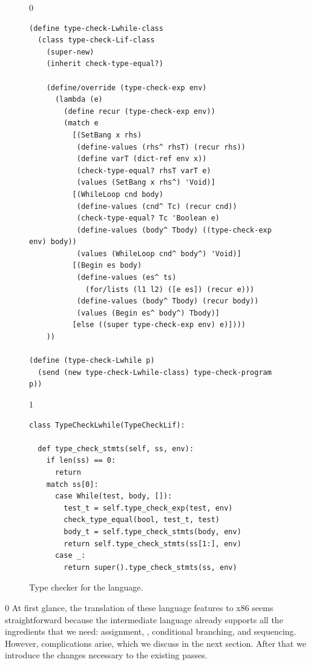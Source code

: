 \documentclass[7x10]{TimesAPriori_MIT}%
\def\racketEd{0}
\def\pythonEd{1}
\def\edition{1}
\newcommand{\pythonColor}[0]{}
\numberwithin{theorem}{chapter}
\numberwithin{definition}{chapter}
\numberwithin{equation}{chapter}
\begin{document}
\begin{figure}[tbp]
\begin{tcolorbox}[colback=white]  
{\if\edition\racketEd    
\begin{lstlisting}[basicstyle=\ttfamily\footnotesize]
(define type-check-Lwhile-class
  (class type-check-Lif-class
    (super-new)
    (inherit check-type-equal?)

    (define/override (type-check-exp env)
      (lambda (e)
        (define recur (type-check-exp env))
        (match e
          [(SetBang x rhs)
           (define-values (rhs^ rhsT) (recur rhs))
           (define varT (dict-ref env x))
           (check-type-equal? rhsT varT e)
           (values (SetBang x rhs^) 'Void)]
          [(WhileLoop cnd body)
           (define-values (cnd^ Tc) (recur cnd))
           (check-type-equal? Tc 'Boolean e)
           (define-values (body^ Tbody) ((type-check-exp env) body))
           (values (WhileLoop cnd^ body^) 'Void)]
          [(Begin es body)
           (define-values (es^ ts)
             (for/lists (l1 l2) ([e es]) (recur e)))
           (define-values (body^ Tbody) (recur body))
           (values (Begin es^ body^) Tbody)]
          [else ((super type-check-exp env) e)])))
    ))

(define (type-check-Lwhile p)
  (send (new type-check-Lwhile-class) type-check-program p))
\end{lstlisting}
\fi}
{\if\edition\pythonEd\pythonColor
\begin{lstlisting}
class TypeCheckLwhile(TypeCheckLif):

  def type_check_stmts(self, ss, env):
    if len(ss) == 0:
      return
    match ss[0]:
      case While(test, body, []):
        test_t = self.type_check_exp(test, env)
        check_type_equal(bool, test_t, test)
        body_t = self.type_check_stmts(body, env)
        return self.type_check_stmts(ss[1:], env)
      case _:
        return super().type_check_stmts(ss, env)
\end{lstlisting}
\fi}
\end{tcolorbox}

\caption{Type checker for the \LangLoop{} language.}
\label{fig:type-check-Lwhile}
\end{figure}


{\if\edition\racketEd    
%  
At first glance, the translation of these language features to x86
seems straightforward because the \LangCIf{} intermediate language
already supports all the ingredients that we need: assignment,
, conditional branching, and sequencing. However, 
complications arise, which we discuss in the next section. After
that we introduce the changes necessary to the existing passes.
%
\fi}
\end{document}
